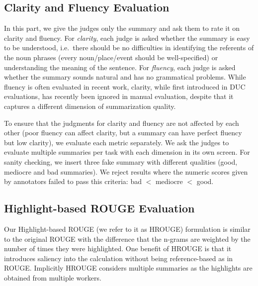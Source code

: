 \documentclass[11pt,a4paper]{article}
\newcommand\hrouge{\textsc{HROUGE}}
\newcommand\rouge{\textsc{ROUGE}}
\begin{document}
\subsection{Clarity and Fluency Evaluation}
In this part, we give the judges only the summary and ask them to rate it on clarity and fluency. For {\em clarity}, each judge is asked whether the summary is easy to be understood, i.e.\ 
there should be no difficulties in identifying the referents of the noun phrases (every noun/place/event should be well-specified) or understanding the meaning of the sentence. For {\em fluency}, each judge is asked whether the summary sounds natural and has no grammatical problems. %
While fluency is often evaluated in recent work, clarity, while first introduced in DUC evaluations, has recently been ignored in manual evaluation, despite that it captures a different dimension of summarization quality.

To ensure that the judgments for clarity and fluency are not affected by each other (poor fluency can affect clarity, but a summary can have perfect fluency but low clarity), %
we evaluate each metric separately. We ask the judges to evaluate multiple summaries per task with each dimension in its own screen. For sanity checking, we insert three fake summary with different qualities (good, mediocre and bad summaries). We reject results where the numeric scores given by annotators failed to pass this criteria: bad $<$ mediocre $<$ good.

\subsection{Highlight-based ROUGE Evaluation} 
\label{subsec:hrouge}


Our Highlight-based \rouge{} (we refer to it as \hrouge{}) formulation is similar to the original ROUGE with the difference that the n-grams are weighted by the number of times they were highlighted. One benefit of \hrouge{} is that it introduces saliency into the calculation without being reference-based as in \rouge{}. Implicitly \hrouge{} considers multiple summaries as the highlights are obtained from multiple workers. 
\end{document}
